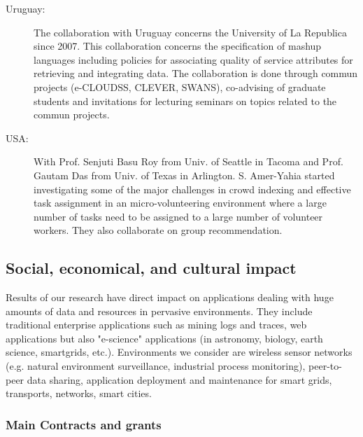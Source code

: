 \begin{description}
\item[Uruguay:] 
The collaboration with Uruguay concerns the University of La Republica since 2007. This collaboration concerns the specification of mashup languages including policies for associating quality of service attributes for retrieving and integrating data. The collaboration is done through commun projects (e-CLOUDSS, CLEVER, SWANS), co-advising of graduate students and invitations for lecturing seminars on topics related to the commun projects.


\item[USA:] 
With Prof. Senjuti Basu Roy from Univ. of Seattle in Tacoma and Prof. Gautam Das from Univ. of Texas in Arlington.
S. Amer-Yahia started investigating some of the major challenges in crowd indexing and effective task assignment
in an micro-volunteering environment where a large number of tasks need to be assigned to a large number of volunteer workers. 
They  also collaborate on group recommendation. 

\end{description}


\subsection{Social, economical, and cultural impact} %
\label{sub:hadas_social_economical_and_cultural_impact}

Results of our research have direct impact on applications dealing with huge amounts of data and resources in pervasive environments. 
They include traditional enterprise applications such as mining logs and traces, web applications but also "e-science" applications (in astronomy, biology, earth science, smartgrids, etc.). 
Environments we consider are wireless sensor networks (e.g. natural environment surveillance, industrial process monitoring), peer-to-peer data sharing, application deployment and maintenance for smart grids, transports, networks, smart cities.  

\subsubsection{Main Contracts and grants}
\label{hadas_contracts}

